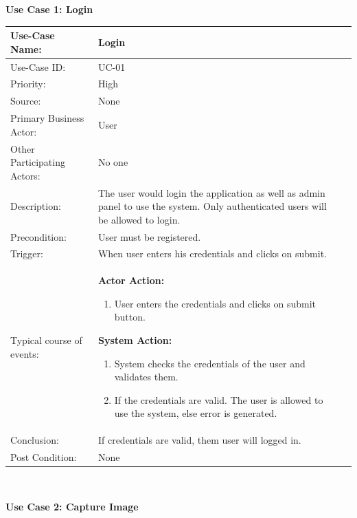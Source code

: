 \noindent
\textbf{Use Case 1: Login}
\begin{table}[H]
    \centering
    \begin{tabular}{|l|p{}|p{}|}
    	\hline
    	Use-Case Name: & Login\\ \hline
    	Use-Case ID:& UC-01 \\\hline
    	Priority:& High\\ \hline
    	Source:& None \\ \hline
    	Primary Business Actor: & User \\ \hline
    	Other Participating Actors:&  No one\\ \hline
    	Description:&  The user would login the application as well as admin panel to use the system. Only authenticated users will be allowed to login. \\ \hline
    	Precondition:&  User must be registered. \\ \hline
    	Trigger:&  When user enters his credentials and clicks on submit. \\ \hline 
    	Typical course of events:&  \textbf{Actor Action:}
    	\begin{enumerate}
    		\item 	User enters the credentials and clicks on submit button.
    	\end{enumerate}
    
    	\vspace{2mm}
    	
    	\textbf{System Action: }
    	\begin{enumerate}
    		\item System checks the credentials of the user and validates them.
    		\item 	If the credentials are valid. The user is allowed to use the system, else error is generated. 
    	\end{enumerate}
    	\\ \hline
    	Conclusion:  & If credentials are valid, them user will logged in.\\ \hline
    	Post Condition: & None \\ \hline
    \end{tabular}\\
\end{table}

\clearpage

\noindent
\textbf{Use Case 2: Capture Image}

